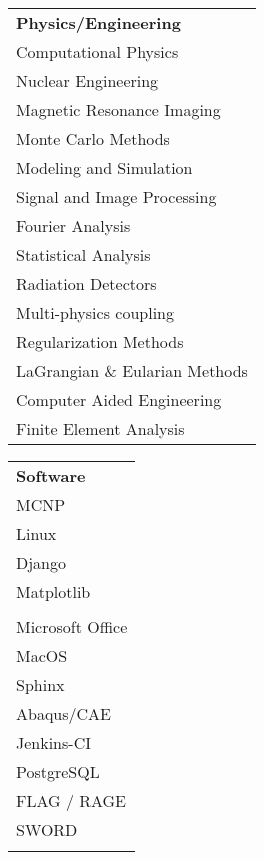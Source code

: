 
\begin{minipage}{0.31\textwidth}
\begin{tabular}{l}
	{\large\textbf{Physics/Engineering}} \\
	\highskillbw Computational Physics \\
	\highskillbw Nuclear Engineering \\
	\highskillbw Magnetic Resonance Imaging \\ 
	\highskillbw Monte Carlo Methods \\
	\highskillbw Modeling and Simulation \\
	\highskillbw Signal and Image Processing \\
	\highskillbw Fourier Analysis \\ 
	\medskillbw Statistical Analysis \\
	\medskillbw Radiation Detectors \\
	\medskillbw Multi-physics coupling \\
	\medskillbw Regularization Methods  \\
	\medskillbw LaGrangian \& Eularian Methods \\
	\lowskillbw Computer Aided Engineering \\
	\lowskillbw Finite Element Analysis \\
\end{tabular}
\end{minipage}%
\begin{minipage}{0.18\textwidth}
	\begin{center}
\begin{tabular}{l}
	{\large\textbf{Software}} \\
	\highskillbw \textsc{MCNP} \\
	\highskillbw Linux \\ 
	\highskillbw Django  \\
	\highskillbw Matplotlib \\ 
	\highskillbw {\fontfamily{ptm}\selectfont \LaTeX} \\ 
	\highskillbw Microsoft Office \\
	\highskillbw MacOS \\
	\highskillbw Sphinx  \\
	\medskillbw Abaqus/CAE \\
	\medskillbw Jenkins-CI \\
	\medskillbw PostgreSQL \\
	\lowskillbw FLAG / RAGE \\
	\lowskillbw SWORD \\
	\\
\end{tabular}
	\end{center}
\end{minipage}%
